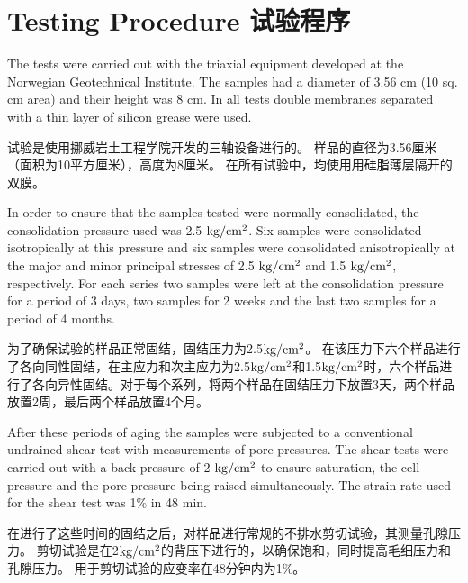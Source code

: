 \section{Testing Procedure 试验程序}

\begin{paracol}{2}
    
    The tests were carried out with the triaxial equipment developed at the Norwegian Geotechnical Institute. The samples had a diameter of 3.56 cm (10 sq. cm area) and their height was 8 cm. In all tests double membranes separated with a thin layer of silicon grease were used.

    \switchcolumn

    试验是使用挪威岩土工程学院开发的三轴设备进行的。 样品的直径为3.56厘米（面积为10平方厘米），高度为8厘米。 在所有试验中，均使用用硅脂薄层隔开的双膜。

    \switchcolumn*

    In order to ensure that the samples tested were normally consolidated, the consolidation pressure used was 2.5 $\rm{kg/cm^2}$. Six samples were consolidated isotropically at this pressure and six samples were consolidated anisotropically at the major and minor principal stresses of 2.5 $\rm{kg/cm^2}$ and 1.5 $\rm{kg/cm^2}$, respectively. For each series two samples were left at the consolidation pressure for a period of 3 days, two samples for 2 weeks and the last two samples for a period of 4 months.
        
    \switchcolumn
    
    为了确保试验的样品正常固结，固结压力为2.5$\rm{kg/cm^2}$。 在该压力下六个样品进行了各向同性固结，在主应力和次主应力为2.5$\rm{kg/cm^2}$和1.5$\rm{kg/cm^2}$时，六个样品进行了各向异性固结。对于每个系列，将两个样品在固结压力下放置3天，两个样品放置2周，最后两个样品放置4个月。

    \switchcolumn*

    After these periods of aging the samples were subjected to a conventional undrained shear test with measurements of pore pressures. The shear tests were carried out with a back pressure of 2 $\rm{kg/cm^2}$ to ensure saturation, the cell pressure and the pore pressure being raised simultaneously. The strain rate used for the shear test was 1$\%$ in 48 min.

    \switchcolumn

    在进行了这些时间的固结之后，对样品进行常规的不排水剪切试验，其测量孔隙压力。 剪切试验是在2$\rm{kg/cm^2}$的背压下进行的，以确保饱和，同时提高毛细压力和孔隙压力。 用于剪切试验的应变率在48分钟内为1$\%$。

\end{paracol}